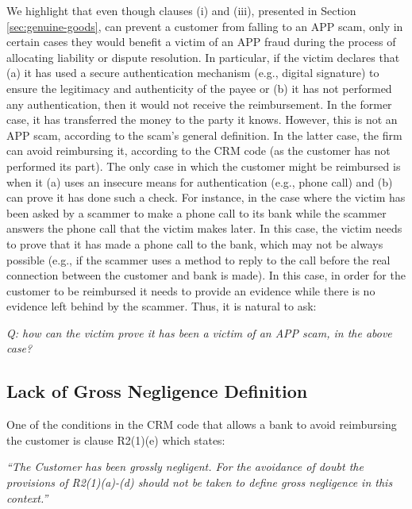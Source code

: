 We highlight that even though clauses (i) and (iii), presented in  Section \ref{sec:genuine-goods}, can prevent a customer from falling to an APP scam, only in certain cases they would   benefit a victim of an APP fraud during the process of allocating liability or dispute resolution.  In particular, if the victim declares that (a)   it has used a   secure authentication mechanism (e.g., digital signature) to ensure  the legitimacy and authenticity of the payee or (b)  it has not performed any authentication, then it would not receive the reimbursement. In the former case, it has transferred the  money to the party it knows. However,   this  is not an APP scam,  according to the scam's general definition.  In the latter case, the firm can avoid reimbursing it, according to the CRM code (as the customer has not performed its part). The only case in which the customer might be reimbursed is when it (a) uses an insecure means for authentication (e.g., phone call) and (b) can prove it has done such a check. For instance, in the case where the victim has been asked by a scammer to make a phone call to its bank while the scammer  answers the phone call that the victim makes later. In this case, the victim needs to  prove that it has made a phone call to the bank, which may not be always possible (e.g., if the scammer uses a method to reply to the call before the real connection between the customer and bank is made).  In this case, in order for the customer to be reimbursed it needs to provide an evidence while there is no evidence left behind by the scammer. Thus, it is natural to ask:

\begin{center}\textit{Q: how can the victim prove it has been a victim of an APP scam, in the above case?}
\end{center}

\subsection{Lack of Gross Negligence Definition}

One of the conditions in the CRM code that allows a bank to avoid reimbursing the customer is clause R2(1)(e) which states: 


\begin{center}\textit{``The Customer has been grossly negligent. For the avoidance of doubt the provisions of R2(1)(a)-(d) should not be taken to define gross negligence in this context.''}
 \end{center}
 
